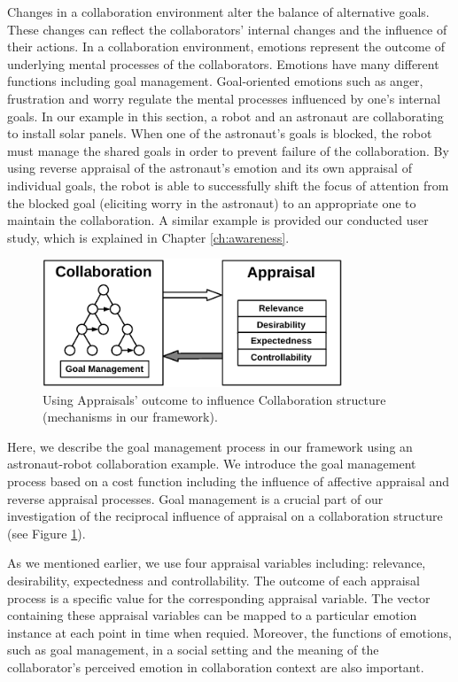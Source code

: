 \documentclass[12pt]{report}
\begin{document}
Changes in a collaboration environment alter the balance of alternative goals.
These changes can reflect the collaborators' internal changes and the influence
of their actions. In a collaboration environment, emotions represent the outcome
of underlying mental processes of the collaborators. Emotions have many
different functions \cite{scheutz:architectural-action-selection} including
goal management. Goal-oriented emotions such as anger, frustration and
worry regulate the mental processes influenced by one's internal goals. In our
example in this section, a robot and an astronaut are collaborating to install
solar panels. When one of the astronaut's goals is blocked, the robot must
manage the shared goals in order to prevent failure of the collaboration. By
using reverse appraisal \cite{gratch:reverse-appraisal} of the astronaut's
emotion and its own appraisal of individual goals, the robot is able to
successfully shift the focus of attention from the blocked goal (eliciting worry
in the astronaut) to an appropriate one to maintain the collaboration. A similar
example is provided our conducted user study, which is explained in Chapter
\ref{ch:awareness}.

\begin{figure}[t]
  \centering
  \includegraphics[width=0.8\textwidth]{figure/goal_management_croped.pdf}
  \caption{Using Appraisals' outcome to influence Collaboration structure
  (mechanisms in our framework).}
  \label{fig:appraisal-on-collaboration}
\end{figure}

Here, we describe the goal management process in our framework using an
astronaut-robot collaboration example. We introduce the goal management process
based on a cost function including the influence of affective appraisal and
reverse appraisal processes. Goal management is a crucial part of our
investigation of the reciprocal influence of appraisal on a collaboration
structure (see Figure \ref{fig:appraisal-on-collaboration}).

As we mentioned earlier, we use four appraisal variables including: relevance,
desirability, expectedness and controllability. The outcome of each appraisal
process is a specific value for the corresponding appraisal variable. The vector
containing these appraisal variables can be mapped to a particular emotion
instance at each point in time when requied. Moreover, the functions of
emotions, such as goal management, in a social setting and the meaning of the
collaborator's perceived emotion in collaboration context are also important.
\end{document}
